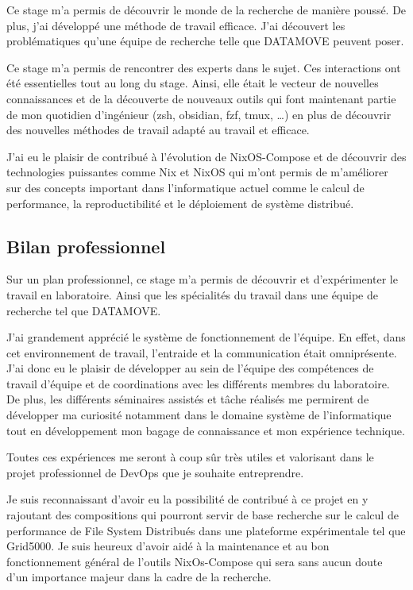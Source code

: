 \documentclass[a4paper,french,12pt, titlepage]{article}
\begin{document}
Ce stage m'a permis de découvrir le monde de la recherche de manière
poussé. De plus, j'ai développé une méthode de travail efficace. J'ai
découvert les problématiques qu'une équipe de recherche telle que
DATAMOVE peuvent poser.

Ce stage m'a permis de rencontrer des experts dans le sujet. Ces
interactions ont été essentielles tout au long du stage. Ainsi, elle
était le vecteur de nouvelles connaissances et de la découverte de
nouveaux outils qui font maintenant partie de mon quotidien d'ingénieur
(zsh, obsidian, fzf, tmux, \ldots) en plus de découvrir des nouvelles
méthodes de travail adapté au travail et efficace.

J'ai eu le plaisir de contribué à l'évolution de NixOS-Compose et de
découvrir des technologies puissantes comme Nix et NixOS qui m'ont
permis de m'améliorer sur des concepts important dans l'informatique
actuel comme le calcul de performance, la reproductibilité et le
déploiement de système distribué.\newline

\hypertarget{bilan-professionnel}{%
\subsection{Bilan professionnel}\label{bilan-professionnel}}

Sur un plan professionnel, ce stage m'a permis de découvrir et
d'expérimenter le travail en laboratoire. Ainsi que les spécialités du
travail dans une équipe de recherche tel que DATAMOVE.

J'ai grandement apprécié le système de fonctionnement de l'équipe. En
effet, dans cet environnement de travail, l'entraide et la communication
était omniprésente. J'ai donc eu le plaisir de développer au sein de
l'équipe des compétences de travail d'équipe et de coordinations avec
les différents membres du laboratoire. De plus, les différents
séminaires assistés et tâche réalisés me permirent de développer ma
curiosité notamment dans le domaine système de l'informatique tout en
développement mon bagage de connaissance et mon expérience technique.

Toutes ces expériences me seront à coup sûr très utiles et valorisant
dans le projet professionnel de DevOps que je souhaite entreprendre.

Je suis reconnaissant d'avoir eu la possibilité de contribué à ce projet
en y rajoutant des compositions qui pourront servir de base recherche
sur le calcul de performance de File System Distribués dans une
plateforme expérimentale tel que Grid5000. Je suis heureux d'avoir aidé
à la maintenance et au bon fonctionnement général de l'outils
NixOs-Compose qui sera sans aucun doute d'un importance majeur dans la
cadre de la recherche.\newline
\end{document}

